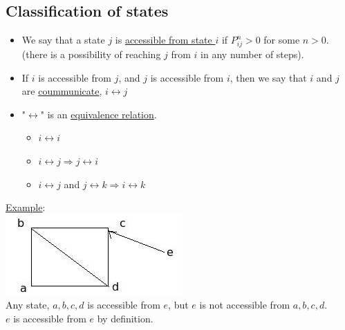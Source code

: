   \subsection*{Classification of states}
    \begin{itemize}
      \item We say that a state $j$ is \underline{accessible from state $i$}
        if $P_{ij}^n > 0$ for some $n > 0$. (there is a possibility of 
        reaching $j$ from $i$ in any number of steps).
      \item If $i$ is accessible from $j$, and $j$ is accessible from $i$,
        then we say that $i$ and $j$ are \underline{coummunicate}, $i 
        \leftrightarrow j$
      \item "$\leftrightarrow$" is an \underline{equivalence relation}.
        \begin{itemize}
          \item $i \leftrightarrow i$
          \item $i \leftrightarrow j \Rightarrow j \leftrightarrow i$
          \item $i \leftrightarrow j$ and $j \leftrightarrow k \Rightarrow i \leftrightarrow k$
        \end{itemize}
    \end{itemize}
    \underline{Example}:\\ \includegraphics{4_20_3.jpeg}\\
    Any state, $a, b, c, d$ is accessible from $e$, but $e$ is not accessible
    from $a, b, c, d$.\\
    $e$ is accessible from $e$ by definition.\\
